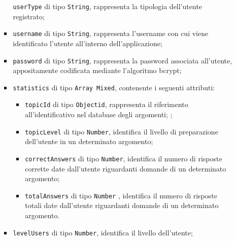 \begin{itemize}
\begin{itemize}
\begin{itemize}
					\texttt{userType} di tipo \texttt{String}, rappresenta la tipologia dell'utente registrato;
				\item 
					\texttt{username} di tipo \texttt{String}, rappresenta l'username con cui viene identificato l'utente all'interno dell'applicazione;		
				\item
					\texttt{password} di tipo \texttt{String}, rappresenta la password associata all'utente,  appositamente codificata mediante l'algoritmo bcrypt;  		
				\item
					\texttt{statistics} di tipo \texttt{Array Mixed}, contenente i seguenti attributi:
				\begin{itemize}
					\item
						\texttt{topicId} di tipo \texttt{Objectid}, rappresenta il riferimento all'identificativo nel database degli argomenti;		; 
					\item
						 \texttt{topicLevel} di tipo \texttt{Number}, identifica il livello di preparazione dell'utente in un determinato argomento;
					\item
						\texttt{correctAnswers} di tipo \texttt{Number}, identifica il numero di risposte corrette date dall'utente riguardanti domande di un determinato argomento; 
					\item						
						 \texttt{totalAnswers} di tipo \texttt{Number} , identifica il numero di risposte totali date dall'utente riguardanti domande di un determinato argomento.		
				\end{itemize}		
				\item 
					\texttt{levelUsers} di tipo \texttt{Number}, identifica il livello dell'utente;				
				

\end{itemize}
\end{itemize}
\end{itemize}
